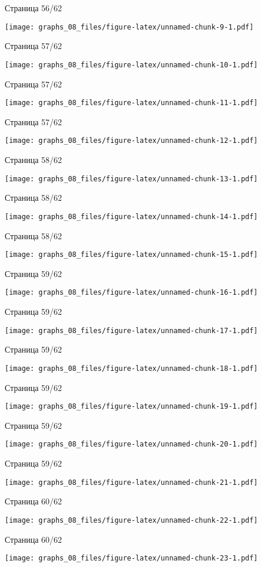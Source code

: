 \documentclass[russian,]{article}
\begin{document}
\newpage
Страница 56/62

\texttt{[image: graphs\_08\_files/figure-latex/unnamed-chunk-9-1.pdf]}

\newpage
Страница 57/62

\texttt{[image: graphs\_08\_files/figure-latex/unnamed-chunk-10-1.pdf]}

\newpage
Страница 57/62

\texttt{[image: graphs\_08\_files/figure-latex/unnamed-chunk-11-1.pdf]}

\newpage
Страница 57/62

\texttt{[image: graphs\_08\_files/figure-latex/unnamed-chunk-12-1.pdf]}

\newpage
Страница 58/62

\texttt{[image: graphs\_08\_files/figure-latex/unnamed-chunk-13-1.pdf]}

\newpage
Страница 58/62

\texttt{[image: graphs\_08\_files/figure-latex/unnamed-chunk-14-1.pdf]}

\newpage
Страница 58/62

\texttt{[image: graphs\_08\_files/figure-latex/unnamed-chunk-15-1.pdf]}

\newpage
Страница 59/62

\texttt{[image: graphs\_08\_files/figure-latex/unnamed-chunk-16-1.pdf]}

\newpage
Страница 59/62

\texttt{[image: graphs\_08\_files/figure-latex/unnamed-chunk-17-1.pdf]}

\newpage
Страница 59/62

\texttt{[image: graphs\_08\_files/figure-latex/unnamed-chunk-18-1.pdf]}

\newpage
Страница 59/62

\texttt{[image: graphs\_08\_files/figure-latex/unnamed-chunk-19-1.pdf]}

\newpage
Страница 59/62

\texttt{[image: graphs\_08\_files/figure-latex/unnamed-chunk-20-1.pdf]}

\newpage
Страница 59/62

\texttt{[image: graphs\_08\_files/figure-latex/unnamed-chunk-21-1.pdf]}

\newpage
Страница 60/62

\texttt{[image: graphs\_08\_files/figure-latex/unnamed-chunk-22-1.pdf]}

\newpage
Страница 60/62

\texttt{[image: graphs\_08\_files/figure-latex/unnamed-chunk-23-1.pdf]}
\end{document}
